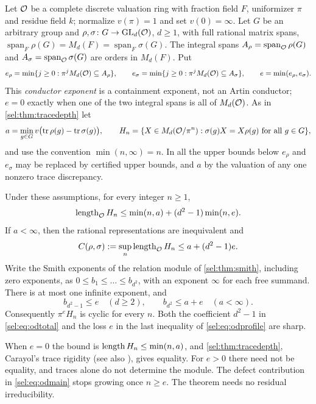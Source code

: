 Let $\mathcal{O}$ be a complete discrete valuation ring with fraction field $F$,
uniformizer $\pi$ and residue field $k$; normalize $v(\pi)=1$ and set
$v(0)=\infty$. Let $G$ be an arbitrary group and
$\rho,\sigma\colon G\to\operatorname{GL}_d(\mathcal{O})$, $d\ge1$, with full rational matrix
spans, $\operatorname{span}_F\rho(G)=M_d(F)=\operatorname{span}_F\sigma(G)$.
The integral spans $A_\rho=\operatorname{span}_{\mathcal{O}}\rho(G)$ and
$A_\sigma=\operatorname{span}_{\mathcal{O}}\sigma(G)$ are orders in $M_d(F)$. Put
\[
 e_\rho=\min\{j\ge0:\pi^jM_d(\mathcal{O})\subseteq A_\rho\},\qquad
 e_\sigma=\min\{j\ge0:\pi^jM_d(\mathcal{O})\subseteq A_\sigma\},\qquad
 e=\min(e_\rho,e_\sigma).
\]
This \emph{conductor exponent} is a containment exponent, not an Artin
conductor; $e=0$ exactly when one of the two integral spans is all of
$M_d(\mathcal{O})$. As in \cref{sel:thm:tracedepth} let
\[
 a=\min_{g\in G}v\bigl(\operatorname{tr}\rho(g)-\operatorname{tr}\sigma(g)\bigr),\qquad
 H_n=\{X\in M_d(\mathcal{O}/\pi^n):\sigma(g)X=X\rho(g)\ \text{for all }g\in G\},
\]
and use the convention $\min(n,\infty)=n$. In all the upper bounds below
$e_\rho$ and $e_\sigma$ may be replaced by certified upper bounds, and $a$ by
the valuation of any one nonzero trace discrepancy.

\begin{theorem}\label{sel:thm:orderdefect}
Under these assumptions, for every integer $n\ge1$,
\begin{equation}\label{sel:eq:odmain}
 \operatorname{length}_{\mathcal{O}}H_n\le\min(n,a)+(d^2-1)\min(n,e).
\end{equation}
If $a<\infty$, then the rational representations are inequivalent and
\begin{equation}\label{sel:eq:odtotal}
 C(\rho,\sigma):=\sup_n\operatorname{length}_{\mathcal{O}}H_n\le a+(d^2-1)e.
\end{equation}
Write the Smith exponents of the relation module of \cref{sel:thm:smith},
including zero exponents, as $0\le b_1\le\dots\le b_{d^2}$, with an
exponent $\infty$ for each free summand. There is at most one infinite
exponent, and
\begin{equation}\label{sel:eq:odprofile}
 b_{d^2-1}\le e\quad(d\ge2),\qquad b_{d^2}\le a+e\quad(a<\infty).
\end{equation}
Consequently $\pi^eH_n$ is cyclic for every $n$. Both the coefficient
$d^2-1$ in \eqref{sel:eq:odtotal} and the loss $e$ in the last inequality
of \eqref{sel:eq:odprofile} are sharp.
\end{theorem}

When $e=0$ the bound is $\operatorname{length} H_n\le\min(n,a)$, and
\cref{sel:thm:tracedepth}, Carayol's trace rigidity
\cite{Carayol1994Representations,Carayol1994Formes} (see also
\cite[Theorem~1]{Serre1993Representations}), gives equality. For $e>0$
there need not be equality, and traces alone do not determine the module.
The defect contribution in \eqref{sel:eq:odmain} stops growing once
$n\ge e$. The theorem needs no residual irreducibility.

